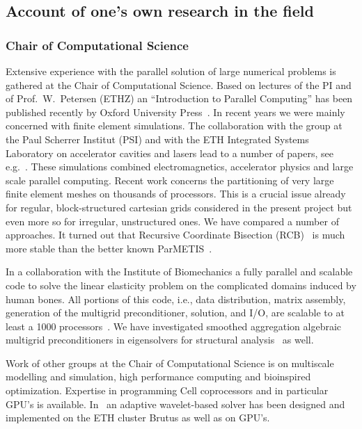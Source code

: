 \documentclass[11pt,pdftex]{article}
\begin{document}
\subsection{Account of one's own research in the field}


\subsubsection{Chair of Computational Science}

Extensive experience with the parallel solution of large numerical
problems is gathered at the Chair of Computational Science.  Based on
lectures of the PI and of Prof.~W.~Petersen (ETHZ) an ``Introduction to
Parallel Computing'' has been published recently by Oxford University
Press~\cite{pear:04}.  In recent years we were mainly concerned with
finite element simulations.  The collaboration with the group at the
Paul Scherrer Institut (PSI) and with the ETH Integrated Systems
Laboratory on accelerator cavities and lasers lead to a number of
papers, see e.g.~\cite{arga:01, arge:04, abgh:04, adai:10}.  These
simulations combined electromagnetics, accelerator physics and large
scale parallel computing.  Recent work concerns the partitioning of very
large finite element meshes on thousands of processors.  This is a
crucial issue already for regular, block-structured cartesian grids
considered in the present project but even more so for irregular,
unstructured ones.  We have compared a number of approaches.  It turned
out that Recursive Coordinate Bisection (RCB)~\cite{debk:04} is much
more stable than the better known ParMETIS~\cite{metis}.

In a collaboration with the Institute of Biomechanics a fully parallel
and scalable code to solve the linear elasticity problem on the
complicated domains induced by human bones.  All portions of this code,
i.e., data distribution, matrix assembly, generation of the multigrid
preconditioner, solution, and I/O, are scalable to at least a 1000
processors~\cite{almm:06, almm:07, bcaf:10, wmvf:10}.  We have
investigated smoothed aggregation algebraic multigrid preconditioners in
eigensolvers for structural analysis~\cite{ahlt:05} as well.

Work of other groups at the Chair of Computational Science is on
multiscale modelling and simulation, high performance computing and
bioinspired optimization.  Expertise in programming Cell coprocessors
and in particular GPU's is available.  In~\cite{rbhk:09} an adaptive
wavelet-based solver has been designed and implemented on the ETH
cluster Brutus as well as on GPU's.
\end{document}
